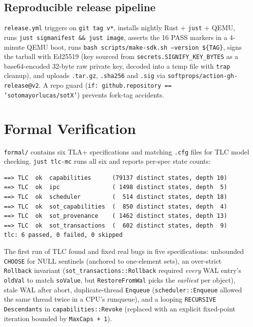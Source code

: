 \documentclass[11pt,a4paper]{article}
\begin{document}
\subsection{Reproducible release pipeline}

\texttt{release.yml} triggers on \texttt{git tag v*}, installs nightly
Rust + \texttt{just} + QEMU, runs \texttt{just sigmanifest \&\& just
image}, asserts the 16 PASS markers in a 4-minute QEMU boot, runs
\texttt{bash scripts/make-sdk.sh --version \$\{TAG\}}, signs the
tarball with Ed25519 (key sourced from
\texttt{secrets.SIGNIFY\_KEY\_BYTES} as a base64-encoded 32-byte raw
private key, decoded into a temp file with \texttt{trap} cleanup),
and uploads \texttt{.tar.gz}, \texttt{.sha256} and \texttt{.sig} via
\texttt{softprops/action-gh-release@v2}. A repo guard
(\texttt{if: github.repository == 'sotomayorlucas/sotX'}) prevents
fork-tag accidents.

\section{Formal Verification}

\texttt{formal/} contains six TLA+ specifications and matching
\texttt{.cfg} files for TLC model checking. \texttt{just tlc-mc} runs
all six and reports per-spec state counts:

\begin{lstlisting}[language={}]
==> TLC  ok  capabilities      (79137 distinct states, depth 10)
==> TLC  ok  ipc               ( 1498 distinct states, depth  5)
==> TLC  ok  scheduler         (  514 distinct states, depth 18)
==> TLC  ok  sot_capabilities  (  850 distinct states, depth  4)
==> TLC  ok  sot_provenance    ( 1462 distinct states, depth 13)
==> TLC  ok  sot_transactions  (  602 distinct states, depth  9)
tlc: 6 passed, 0 failed, 0 skipped
\end{lstlisting}

The first run of TLC found and fixed real bugs in five specifications:
unbounded \texttt{CHOOSE} for NULL sentinels (anchored to one-element
sets), an over-strict \texttt{Rollback} invariant
(\texttt{sot\_transactions::Rollback} required \emph{every} WAL entry's
\texttt{oldVal} to match \texttt{soValue}, but \texttt{RestoreFromWal}
picks the \emph{earliest} per object), stale WAL after abort,
duplicate-thread \texttt{Enqueue} (\texttt{scheduler::Enqueue} allowed
the same thread twice in a CPU's runqueue), and a looping
\texttt{RECURSIVE Descendants} in \texttt{capabilities::Revoke}
(replaced with an explicit fixed-point iteration bounded by
\texttt{MaxCaps + 1}).
\end{document}
